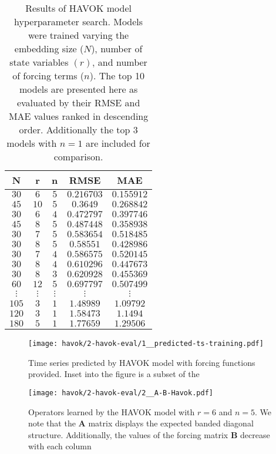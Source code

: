 \begin{table}[h]
  \caption{Results of HAVOK model hyperparameter search. Models were trained
    varying the embedding size ($N$), number of state variables $(r)$, and
    number of forcing terms ($n$). The top 10 models are presented here as
    evaluated by their RMSE and MAE values ranked in descending order.
    Additionally the top 3 models with $n=1$ are included for comparison.}
  \label{tab:havok-fit-results}
  \centering
  \begin{tabular}{ccccc} \hline
    \textbf{N} & \textbf{r} & \textbf{n} & \textbf{RMSE}  & \textbf{MAE} \\ \hline
    $30$ & $6$ & $5$ & $0.216703$ & $0.155912$ \\
    $45$ & $10$ & $5$ & $0.3649$ & $0.268842$ \\
    $30$ & $6$ & $4$ & $0.472797$ & $0.397746$ \\
    $45$ & $8$ & $5$ & $0.487448$ & $0.358938$ \\
    $30$ & $7$ & $5$ & $0.583654$ & $0.518485$ \\
    $30$ & $8$ & $5$ & $0.58551$ & $0.428986$ \\
    $30$ & $7$ & $4$ & $0.586575$ & $0.520145$ \\
    $30$ & $8$ & $4$ & $0.610296$ & $0.447673$ \\
    $30$ & $8$ & $3$ & $0.620928$ & $0.455369$ \\
    $60$ & $12$ & $5$ & $0.697797$ & $0.507499$ \\
    $\vdots$ & $\vdots$ & $\vdots$ & $\vdots$ & $\vdots$ \\
    $105$ & $3$ & $1$ & $1.48989$ & $1.09792$  \\
    $120$ & $3$ & $1$ &  $1.58473$ & $1.1494$ \\
    $180$ & $5$ & $1$ & $1.77659$ & $1.29506$ 
  \end{tabular}
\end{table}



\begin{figure}[h]
  \centering
  \texttt{[image: havok/2-havok-eval/1\_\_predicted-ts-training.pdf]}
  \caption{Time series predicted by HAVOK model with forcing functions provided.
  Inset into the figure is a subset of the }
  \label{fig:pm-havok-predictions}
\end{figure}




\begin{figure}[h]
  \centering
  \texttt{[image: havok/2-havok-eval/2\_\_A-B-Havok.pdf]}
  \caption{Operators learned by the HAVOK model with $r=6$ and $n=5$. We note
    that the $\mathbf{A}$ matrix displays the expected banded diagonal
    structure. Additionally, the values of the forcing matrix $\mathbf{B}$
    decrease with each column}
  \label{fig:pm-havok-operators}
\end{figure}



